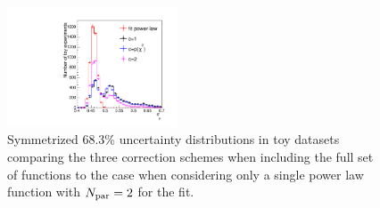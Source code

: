\begin{figure}[tbp]
\centering
\includegraphics[width=0.45\textwidth]{correction/compare_error_magnitude.pdf}
\caption{Symmetrized 68.3\% uncertainty distributions in toy datasets 
comparing the three correction schemes 
when including the full set of functions 
to the case when considering only a single power law function 
with $N_{\rm par}=2$ for the fit.}
\label{fig:correction:compareerrors}
\end{figure}


